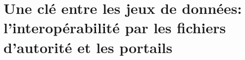 \section{\label{I-A-3}Une clé entre les jeux de données: l'interopérabilité par les fichiers d'autorité et les portails}
